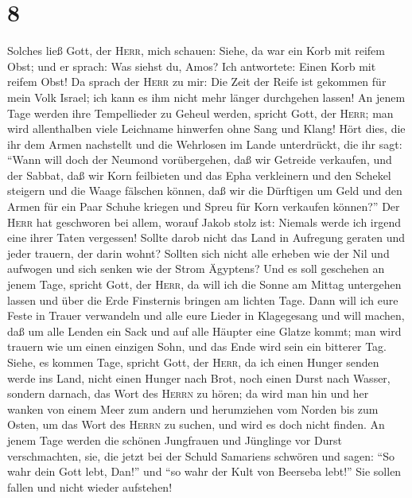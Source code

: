 \hypertarget{section-7}{%
\section{8}\label{section-7}}

 Solches ließ Gott, der \textsc{Herr}, mich schauen:
Siehe, da war ein Korb mit reifem Obst;  und er sprach:
Was siehst du, Amos? Ich antwortete: Einen Korb mit reifem Obst! Da
sprach der \textsc{Herr} zu mir: Die Zeit der Reife ist gekommen für
mein Volk Israel; ich kann es ihm nicht mehr länger durchgehen lassen!
 An jenem Tage werden ihre Tempellieder zu Geheul werden,
spricht Gott, der \textsc{Herr}; man wird allenthalben viele Leichname
hinwerfen ohne Sang und Klang!  Hört dies, die ihr dem
Armen nachstellt und die Wehrlosen im Lande unterdrückt, 
die ihr sagt: ``Wann will doch der Neumond vorübergehen, daß wir
Getreide verkaufen, und der Sabbat, daß wir Korn feilbieten und das Epha
verkleinern und den Schekel steigern und die Waage fälschen können,
 daß wir die Dürftigen um Geld und den Armen für ein Paar
Schuhe kriegen und Spreu für Korn verkaufen können?''  Der
\textsc{Herr} hat geschworen bei allem, worauf Jakob stolz ist: Niemals
werde ich irgend eine ihrer Taten vergessen!  Sollte darob
nicht das Land in Aufregung geraten und jeder trauern, der darin wohnt?
Sollten sich nicht alle erheben wie der Nil und aufwogen und sich senken
wie der Strom Ägyptens?  Und es soll geschehen an jenem
Tage, spricht Gott, der \textsc{Herr}, da will ich die Sonne am Mittag
untergehen lassen und über die Erde Finsternis bringen am lichten Tage.
 Dann will ich eure Feste in Trauer verwandeln und alle
eure Lieder in Klagegesang und will machen, daß um alle Lenden ein Sack
und auf alle Häupter eine Glatze kommt; man wird trauern wie um einen
einzigen Sohn, und das Ende wird sein ein bitterer Tag. 
Siehe, es kommen Tage, spricht Gott, der \textsc{Herr}, da ich einen
Hunger senden werde ins Land, nicht einen Hunger nach Brot, noch einen
Durst nach Wasser, sondern darnach, das Wort des \textsc{Herrn} zu
hören;  da wird man hin und her wanken von einem Meer zum
andern und herumziehen vom Norden bis zum Osten, um das Wort des
\textsc{Herrn} zu suchen, und wird es doch nicht finden. 
An jenem Tage werden die schönen Jungfrauen und Jünglinge vor Durst
verschmachten,  sie, die jetzt bei der Schuld Samariens
schwören und sagen: ``So wahr dein Gott lebt, Dan!'' und ``so wahr der
Kult von Beerseba lebt!'' Sie sollen fallen und nicht wieder aufstehen!

